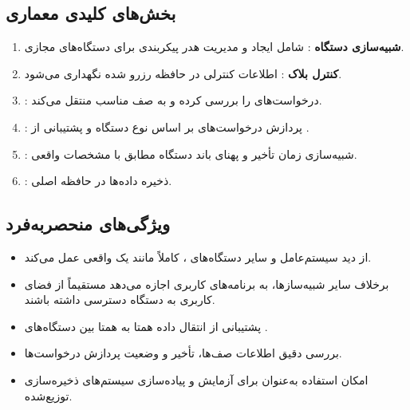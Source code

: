 \documentclass[12pt]{article}
\begin{document}
\subsection*{بخش‌های کلیدی معماری }
\begin{enumerate}
    \item \textbf{شبیه‌سازی دستگاه }: شامل ایجاد و مدیریت هدر پیکربندی برای دستگاه‌های مجازی.
    \item \textbf{کنترل بلاک }: اطلاعات کنترلی در حافظه رزرو شده نگهداری می‌شود.
    \item \textbf{}: درخواست‌های  را بررسی کرده و به صف مناسب منتقل می‌کند.
    \item \textbf{}: پردازش درخواست‌های  بر اساس نوع دستگاه و پشتیبانی از .
    \item \textbf{}: شبیه‌سازی زمان تأخیر و پهنای باند دستگاه مطابق با مشخصات واقعی.
    \item \textbf{}: ذخیره داده‌ها در حافظه اصلی.
\end{enumerate}

\subsection*{ویژگی‌های منحصربه‌فرد }
\begin{itemize}
    \item از دید سیستم‌عامل و سایر دستگاه‌های ،  کاملاً مانند یک  واقعی عمل می‌کند.
    \item برخلاف سایر شبیه‌سازها،  به برنامه‌های کاربری اجازه می‌دهد مستقیماً از فضای کاربری  به دستگاه دسترسی داشته باشند.
    \item پشتیبانی از انتقال داده همتا به همتا  بین دستگاه‌های .
    \item بررسی دقیق اطلاعات صف‌ها، تأخیر و وضعیت پردازش درخواست‌ها.
    \item امکان استفاده به‌عنوان  برای آزمایش و پیاده‌سازی سیستم‌های ذخیره‌سازی توزیع‌شده.
\end{itemize}
\end{document}
